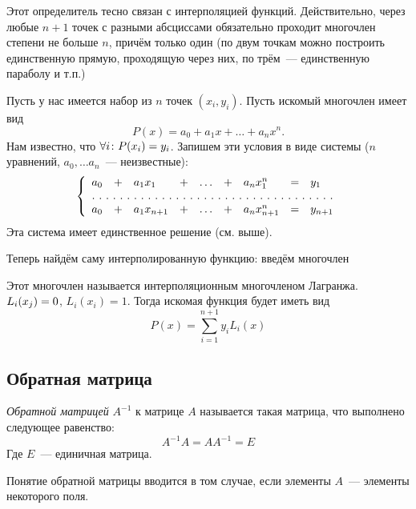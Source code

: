 Этот определитель тесно связан с интерполяцией функций. Действительно, через любые $n+1$ точек с разными абсциссами обязательно проходит многочлен степени не больше $n$, причём только один (по двум точкам можно построить единственную прямую, проходящую через них, по трём~--- единственную параболу и т.п.)

Пусть у нас имеется набор из $n$ точек $(x_i,y_i)$. Пусть искомый многочлен имеет вид $$P(x)=a_0+a_1x+\dots+a_nx^n.$$ Нам известно, что $\forall i\colon P(x_i)=y_i$. Запишем эти условия в виде системы ($n$ уравнений, $a_0,\dots a_n$~--- неизвестные):
$$
\left\{
 \begin{array}{lllllllll}
  a_0&+&a_1x_1&+&\dots&+&a_nx_1^n&=&y_1\\
  \hdotsfor[2]{9}\\
  a_0&+&a_1x_{n+1}&+&\dots&+&a_nx_{n+1}^n&=&y_{n+1}\\
 \end{array}
\right.
$$
Эта система имеет единственное решение (см. выше).

Теперь найдём саму интерполированную функцию: введём многочлен
 
  \begin{center}
  \end{center}
 
 Этот многочлен называется интерполяционным многочленом Лагранжа. $L_i(x_j)\bw=0$, $L_i(x_i)=1$. Тогда искомая функция будет иметь вид
 $$P(x)=\sum_{i=1}^{n+1}y_iL_i(x)$$

\subsection{Обратная матрица}
\label{matrixdet:reverse}

\begin{df}
	\emph{Обратной матрицей} $A^{-1}$ к матрице $A$ называется такая
	матрица, что выполнено следующее равенство:
	$$ A^{-1}A=AA^{-1}=E$$%
	Где $E$~--- единичная матрица.
\end{df}

\begin{note}
	Понятие обратной матрицы вводится в том случае, если элементы
	$A$~--- элементы некоторого поля.
\end{note}

